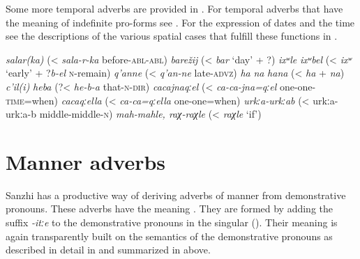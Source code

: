 Some more temporal adverbs are provided in . For temporal adverbs that have the meaning of indefinite pro-forms see . For the expression of dates and the time see the descriptions of the various spatial cases that fulfill these functions in .

\begin{exe}
	\ex	\label{ex:adjectivesWithSalarka}
	\begin{xlist}
		\TabPositions{14em}
		\ex \textit{salar(ka)} 	(< \textit{sala-r-ka} before-\textsc{abl-abl}) 
		\ex	\textit{barežij}  (< \textit{bar} `day' + ?)
		\ex \textit{ixʷle} 		
		\ex \textit{ixʷbel}  (< \textit{ixʷ} `early' + ?\textit{b-el} \textsc{n}-remain)
		\ex	\textit{q'anne}  (< \textit{q'an-ne} late-\textsc{advz})
		\ex	\textit{ha}  
		\ex	\textit{na}  
		\ex \textit{hana} 	(< \textit{ha} + \textit{na})
		\ex \textit{c'il(i)} 		
		\ex \textit{heba}  (?< \textit{he-b-a} that-\textsc{n-dir})
		\ex \textit{cacajnaqːel}  (< \textit{ca-ca-jna=qːel} one-one-\textsc{time}=when)
		\ex \textit{cacaqːella}  (< \textit{ca-ca=qːella} one-one=when)
		\ex \textit{urkːa-urkːab}  (< urkːa-urkːa-b middle-middle-\textsc{n})
		\ex \textit{mah-mahle, raχ-raχle}  (< \textit{raχle} `if')
		\end{xlist}
\end{exe}



\section{Manner adverbs}
\label{sec:MannerAdverbs}

Sanzhi has a productive way of deriving adverbs of manner from demonstrative pronouns. These adverbs have the meaning . They are formed by adding the suffix \textit{-itːe} to the demonstrative pronouns in the singular (). Their meaning is again transparently built on the semantics of the demonstrative pronouns as described in detail in  and summarized in  above.


